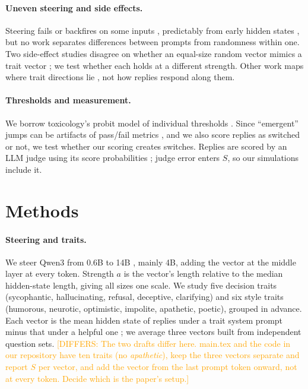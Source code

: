 \documentclass[11pt]{article}
\newcommand{\differ}[1]{\textcolor{orange}{[DIFFERS: #1]}}
\begin{document}
\paragraph{Uneven steering and side effects.} Steering fails or backfires on some inputs \cite{tan2024reliability,braun2025unreliability}, predictably from early hidden states \cite{fan2026steerable}, but no work separates differences between prompts from randomness within one. Two side-effect studies disagree on whether an equal-size random vector mimics a trait vector \cite{malla2026interference,ong2026sideeffects}; we test whether each holds at a different strength. Other work maps where trait directions lie \cite{lu2026assistant,xu2026manifold,abootorabi2026geometry}, not how replies respond along them.

\paragraph{Thresholds and measurement.} We borrow toxicology's probit model of individual thresholds \cite{bliss1934probit,finney1971probit}. Since ``emergent'' jumps \cite{wei2022emergent} can be artifacts of pass/fail metrics \cite{schaeffer2023mirage}, and we also score replies as switched or not, we test whether our scoring creates switches. Replies are scored by an LLM judge \cite{zheng2023judge} using its score probabilities \cite{liu2023geval}; judge error enters $S$, so our simulations include it.

\section{Methods}

\paragraph{Steering and traits.} We steer Qwen3 from 0.6B to 14B \cite{yang2025qwen3}, mainly 4B, adding the vector at the middle layer at every token. Strength $a$ is the vector's length relative to the median hidden-state length, giving all sizes one scale. We study five decision traits (sycophantic, hallucinating, refusal, deceptive, clarifying) and six style traits (humorous, neurotic, optimistic, impolite, apathetic, poetic), grouped in advance. Each vector is the mean hidden state of replies under a trait system prompt minus that under a helpful one \cite{chen2025persona}; we average three vectors built from independent question sets.
\differ{The two drafts differ here. main.tex and the code in our repository have
ten traits (no \emph{apathetic}), keep the three vectors separate and report $S$
per vector, and add the vector from the last prompt token onward, not at every
token. Decide which is the paper's setup.}
\end{document}
